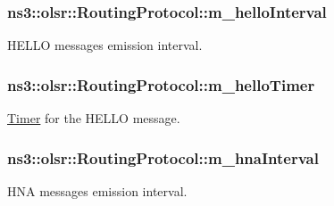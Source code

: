 \subsubsection[{\texorpdfstring{m\+\_\+hello\+Interval}{m_helloInterval}}]{ ns3\+::olsr\+::\+Routing\+Protocol\+::m\+\_\+hello\+Interval\hspace{0.3cm}{\ttfamily [private]}}\hypertarget{classns3_1_1olsr_1_1RoutingProtocol_ac973c86cbf21168c11cd7f16acc1ae4c}{}\label{classns3_1_1olsr_1_1RoutingProtocol_ac973c86cbf21168c11cd7f16acc1ae4c}


H\+E\+L\+LO messages\textquotesingle{} emission interval. 

\subsubsection[{\texorpdfstring{m\+\_\+hello\+Timer}{m_helloTimer}}]{ ns3\+::olsr\+::\+Routing\+Protocol\+::m\+\_\+hello\+Timer\hspace{0.3cm}{\ttfamily [private]}}\hypertarget{classns3_1_1olsr_1_1RoutingProtocol_aa739535b4dfd71566cb385c9c58f59c9}{}\label{classns3_1_1olsr_1_1RoutingProtocol_aa739535b4dfd71566cb385c9c58f59c9}


\hyperlink{classns3_1_1Timer}{Timer} for the H\+E\+L\+LO message. 

\subsubsection[{\texorpdfstring{m\+\_\+hna\+Interval}{m_hnaInterval}}]{ ns3\+::olsr\+::\+Routing\+Protocol\+::m\+\_\+hna\+Interval\hspace{0.3cm}{\ttfamily [private]}}\hypertarget{classns3_1_1olsr_1_1RoutingProtocol_a0d117664d5991c4b405b9ef14c33ea23}{}\label{classns3_1_1olsr_1_1RoutingProtocol_a0d117664d5991c4b405b9ef14c33ea23}


H\+NA messages\textquotesingle{} emission interval. 

